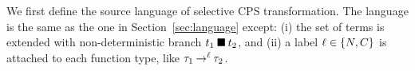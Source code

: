 
%

We first define the source language of selective CPS transformation.
The language is the same as the one in Section~\ref{sec:language} except: (i) the set
of terms is extended with non-deterministic branch ${t_1}\mathbin{\blacksquare}{t_2}$, and (ii)
a label $\ell \in \{N,C\}$ is attached to each function type, like
${\tau_1}\mathbin{\rightarrow^{\ell}}{\tau_2}$.

